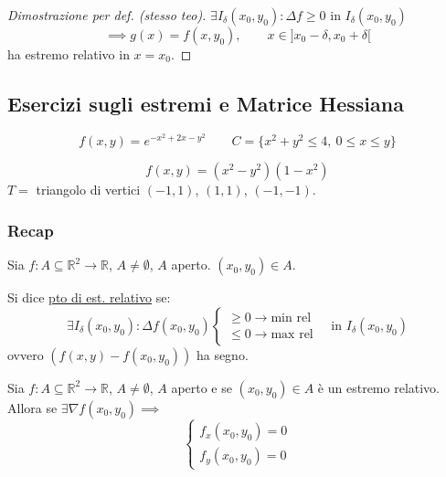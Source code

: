 \begin{proof}[Dimostrazione per def. (stesso teo)]
$\exists I_\delta(x_0, y_0) : \Delta f \ge 0$ in $I_\delta(x_0, y_0)$ 
\[
\implies g(x) = f(x, y_0), \qquad x \in ]x_0 - \delta, x_0 + \delta[
\]
ha estremo relativo in $x = x_0$.

\end{proof}

\subsection{Esercizi sugli estremi e Matrice Hessiana}

\begin{esercizio}[EXE 1]
\[
f(x, y) = e^{-x^2 + 2x - y^2} \qquad C = \{ x^2 + y^2 \le 4, \ 0 \le x \le y \}
\]
\end{esercizio}

\begin{esercizio}[EXE 2]
\[
f(x, y) = (x^2 - y^2)(1 - x^2)
\]
$T =$ triangolo di vertici $(-1, 1)$, $(1, 1)$, $(-1, -1)$.
\end{esercizio}

\subsubsection*{Recap}

\begin{definition}
Sia $f : A \subseteq \mathbb{R}^2 \to \mathbb{R}$, $A \neq \emptyset$, $A$ aperto. $(x_0, y_0) \in A$.

Si dice \underline{pto di est. relativo} se:
\[
\exists I_\delta(x_0, y_0) : \Delta f(x_0, y_0)
\begin{cases}
\ge 0 \to \text{min rel} \\
\le 0 \to \text{max rel}
\end{cases}
\quad \text{in } I_\delta(x_0, y_0)
\]
ovvero $(f(x, y) - f(x_0, y_0))$ ha segno.
\end{definition}

\begin{theorem}
Sia $f : A \subseteq \mathbb{R}^2 \to \mathbb{R}$, $A \neq \emptyset$, $A$ aperto e se $(x_0, y_0) \in A$ è un estremo relativo. Allora se $\exists \nabla f(x_0, y_0) \implies$
\[
\begin{cases}
f_x(x_0, y_0) = 0 \\
f_y(x_0, y_0) = 0
\end{cases}
\]
\end{theorem}

